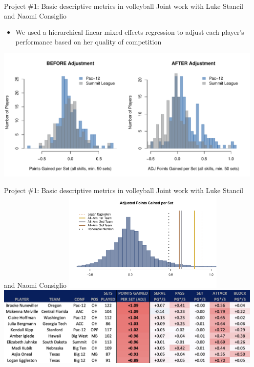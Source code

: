 \documentclass{beamer}
\begin{document}
\begin{frame}{Project \#1: Basic descriptive metrics in volleyball}
  {Joint work with Luke Stancil and Naomi Consiglio}
  \begin{itemize}
    \item We used a hierarchical linear mixed-effects regression to adjust each player's performance based on her quality of competition
  \end{itemize}
  \includegraphics[width = \textwidth]{images/conference_comparison.pdf}
\end{frame}


\begin{frame}{Project \#1: Basic descriptive metrics in volleyball}
  {Joint work with Luke Stancil and Naomi Consiglio}
  \centering
  \includegraphics[width = 0.6\textwidth]{images/avca_all_americans_adj.pdf}\\
  \includegraphics[width = \textwidth]{images/top_ten_players.png}
\end{frame}
\end{document}
